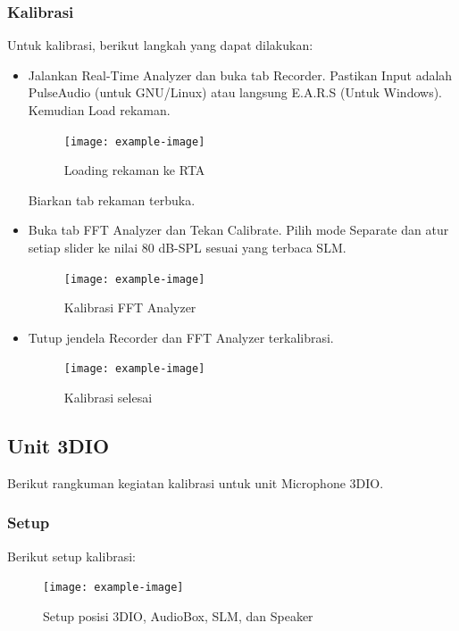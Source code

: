 \documentclass{article}
\begin{document}
	\subsubsection{Kalibrasi}
	
	Untuk kalibrasi, berikut langkah yang dapat dilakukan:
	
	\begin{itemize}
		\item Jalankan Real-Time Analyzer dan buka tab Recorder.
		Pastikan Input adalah PulseAudio (untuk GNU/Linux) atau langsung E.A.R.S (Untuk Windows).
		Kemudian Load rekaman.
		
		\begin{figure}[H]
			\centering
			\texttt{[image: example-image]}
			\caption{Loading rekaman ke RTA}
		\end{figure}
	
		Biarkan tab rekaman terbuka.
	
		\item Buka tab FFT Analyzer dan Tekan Calibrate.
		Pilih mode Separate dan atur setiap slider ke nilai 80 dB-SPL sesuai yang terbaca SLM.
		
		\begin{figure}[H]
			\centering
			\texttt{[image: example-image]}
			\caption{Kalibrasi FFT Analyzer}
		\end{figure}
	
		\item Tutup jendela Recorder dan FFT Analyzer terkalibrasi.
		
		\begin{figure}[H]
			\centering
			\texttt{[image: example-image]}
			\caption{Kalibrasi selesai}
		\end{figure}
		
	\end{itemize}

	\newpage
	
	\subsection{Unit 3DIO}
	
	Berikut rangkuman kegiatan kalibrasi untuk unit Microphone 3DIO.

	\subsubsection{Setup}
	
	Berikut setup kalibrasi:
	
	\begin{figure}[H]
		\centering
		\texttt{[image: example-image]}
		\caption{Setup posisi 3DIO, AudioBox, SLM, dan Speaker}
	\end{figure}
\end{document}
